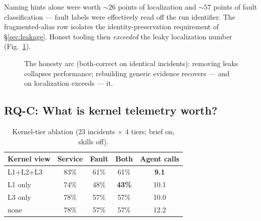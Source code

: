 Naming hints alone were worth ${\sim}26$ points of localization and ${\sim}57$ points
of fault classification --- fault labels were effectively read off the run identifier.
The fragmented-alias row isolates the identity-preservation requirement of
\S\ref{sec:leakage}. Honest tooling then \emph{exceeded} the leaky localization number
(Fig.~\ref{fig:honesty}).

\begin{figure}[t]
\centering
{}
\caption{The honesty arc (both-correct on identical incidents): removing leaks
collapses performance; rebuilding generic evidence recovers --- and on localization
exceeds --- it.}
\label{fig:honesty}
\end{figure}

\subsection{RQ-C: What is kernel telemetry worth?}
\label{sec:results-kernel}

\begin{table}[t]
\caption{Kernel-tier ablation (23 incidents $\times$ 4 tiers; brief on, skills off).}
\label{tab:kernel}
\begin{tabular}{lcccc}
\toprule
Kernel view & Service & Fault & Both & Agent calls \\
\midrule
L1+L2+L3 & 83\% & 61\% & 61\% & \textbf{9.1} \\
L1 only & 74\% & 48\% & \textbf{43\%} & 10.1 \\
L3 only & 78\% & 57\% & 57\% & 10.0 \\
none & 78\% & 57\% & 57\% & 12.2 \\
\bottomrule
\end{tabular}
\end{table}

